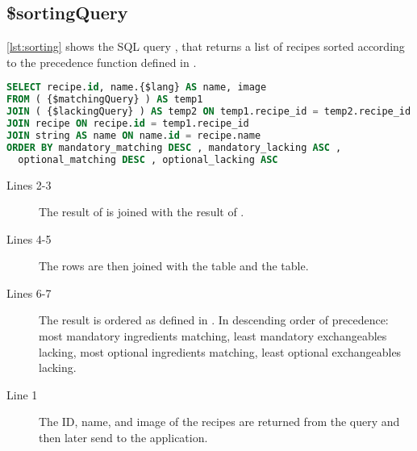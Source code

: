 \subsection*{\$sortingQuery}
\autoref{lst:sorting} shows the SQL query , that returns a list of recipes sorted according to the precedence function defined in .
\begin{lstlisting}[language=SQL, float=h, label={lst:sorting}, caption={\$sortingQuery, combine and sort.}]
SELECT recipe.id, name.{$lang} AS name, image
FROM ( {$matchingQuery} ) AS temp1
JOIN ( {$lackingQuery} ) AS temp2 ON temp1.recipe_id = temp2.recipe_id
JOIN recipe ON recipe.id = temp1.recipe_id
JOIN string AS name ON name.id = recipe.name
ORDER BY mandatory_matching DESC , mandatory_lacking ASC ,
  optional_matching DESC , optional_lacking ASC
\end{lstlisting}
\begin{description}
\item[Lines 2-3] The result of  is joined with the result of .
\item[Lines 4-5] The rows are then joined with the  table and the  table. 
\item[Lines 6-7] The result is ordered as defined in . In descending order of precedence: most mandatory ingredients matching, least mandatory exchangeables lacking, most optional ingredients matching, least optional exchangeables lacking.
\item[Line 1] The ID, name, and image of the recipes are returned from the query and then later send to the application.
\end{description}










